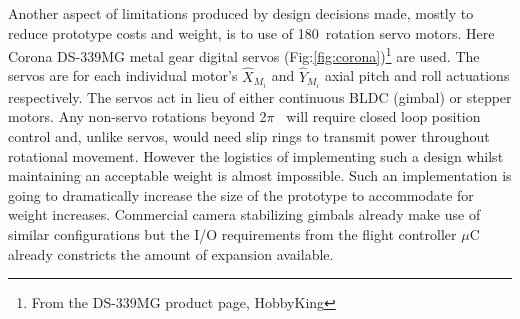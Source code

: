 \par
Another aspect of limitations produced by design decisions made, mostly to reduce prototype costs and weight, is to use of 180\textdegree ~rotation servo motors. Here Corona DS-339MG metal gear digital servos (Fig:\ref{fig:corona})\footnote{From the DS-339MG product page, HobbyKing\cite{hobbyking}} are used. The servos are for each individual motor's $\hat{X}_{M_i}$ and $\hat{Y}_{M_i}$ axial pitch and  roll actuations respectively. The servos act in lieu of either continuous BLDC (gimbal) or stepper motors. Any non-servo rotations beyond 2$\pi$ ~will require closed loop position control and, unlike servos, would need slip rings to transmit power throughout rotational movement. However the logistics of implementing such a design whilst maintaining an acceptable weight is almost impossible. Such an implementation is going to dramatically increase the size of the prototype to accommodate for weight increases. Commercial camera stabilizing gimbals already make use of similar configurations but the I/O requirements from the flight controller $\mu$C already constricts the amount of expansion available.
\par
